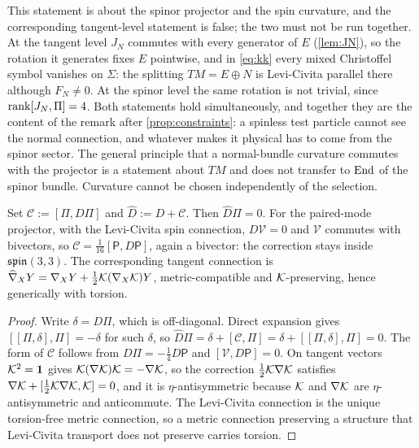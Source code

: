 This statement is about the spinor projector and the spin curvature, and the corresponding tangent-level statement is false; the two must not be run together.
At the tangent level $J_N$ commutes with every generator of $E$ (\cref{lem:JN}), so the rotation it generates fixes $E$ pointwise, and in \eqref{eq:kk} every
mixed Christoffel symbol vanishes on $\Sigma$: the splitting $TM=E\oplus N$ is Levi-Civita parallel there although $F_N\neq0$. At the spinor level the same rotation is
not trivial, since $\operatorname{rank}[J_N,\Pi]=4$. Both statements hold simultaneously, and together they are the content of the remark after \cref{prop:constraints}: a
spinless test particle cannot see the normal connection, and whatever makes it physical has to come from the spinor sector. The general principle that a
normal-bundle curvature commutes with the projector is a statement about $TM$ and does not transfer to $\operatorname{End}$ of the spinor bundle. Curvature cannot be chosen
independently of the selection.

\begin{proposition}
\label{prop:adapted}
Set $\mathcal C:=[\Pi,D\Pi]$ and $\widehat D:=D+\mathcal C$. Then $\widehat D\Pi=0$. For the paired-mode projector, with the Levi-Civita spin connection,
$D\mathcal V=0$ and $\mathcal V$ commutes with bivectors, so $\mathcal C=\tfrac1{16}[\mathsf P,D\mathsf P]$, again a bivector: the correction stays inside $\mathfrak{spin}(3,3)$. The
corresponding tangent connection is $\widehat\nabla_XY=\nabla_XY+\tfrac12\mathcal K(\nabla_X\mathcal K)Y$, metric-compatible and $\mathcal K$-preserving, hence generically with torsion.
\end{proposition}

\begin{proof}
Write $\delta=D\Pi$, which is off-diagonal. Direct expansion gives $[[\Pi,\delta],\Pi]=-\delta$ for such $\delta$, so $\widehat D\Pi=\delta+[\mathcal C,\Pi]=\delta+[[\Pi,\delta],\Pi]=0$.
The form of $\mathcal C$ follows from $D\Pi=-\tfrac14D\mathsf P$ and $[\mathcal V,D\mathsf P]=0$. On tangent vectors $\mathcal K^2=\mathbf 1$ gives $\mathcal K(\nabla\mathcal K)\mathcal K=-\nabla\mathcal K$, so the
correction $\tfrac12\mathcal K\nabla\mathcal K$ satisfies $\nabla\mathcal K+[\tfrac12\mathcal K\nabla\mathcal K,\mathcal K]=0$, and it is $\eta$-antisymmetric because $\mathcal K$ and $\nabla\mathcal K$ are $\eta$-antisymmetric and
anticommute. The Levi-Civita connection is the unique torsion-free metric connection, so a metric connection preserving a structure that Levi-Civita transport
does not preserve carries torsion.
\end{proof}

